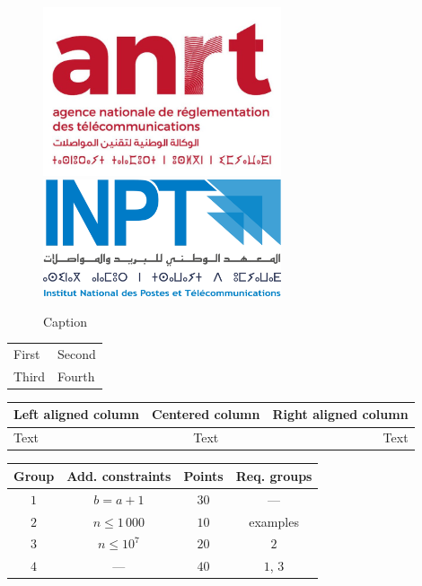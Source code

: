
\begin{figure}[H]
    \centering
    \includegraphics[width=7cm]{Logos/Logo_ANRT.jpg}\hfill
    \includegraphics[width=7cm]{Logos/Logo_INPT.png}
    \caption{Caption}
\end{figure}








\begin{tabular}{ll}
  First & Second \\
  Third & Fourth
\end{tabular}



\begin{tabular}{|l|c|r|} \hline
  Left aligned column & Centered column & Right aligned column \\ \hline
  Text & Text & Text \\ \hline
\end{tabular}


\begin{center}
  \begin{tabular}{ | c | c | c | c | } \hline
    \bf{Group} &
    \bf{Add. constraints} &
    \bf{Points} &
    \bf{Req. groups} \\ \hline
    $1$ & $b = a + 1$ & $30$ & --- \\ \hline
    $2$ & $n \le 1\,000$ & $10$ & examples \\ \hline
    $3$ & $n \le 10^7$ & $20$ & $2$ \\ \hline
    $4$ & --- & $40$ & $1$, $3$ \\ \hline
  \end{tabular}
\end{center}

